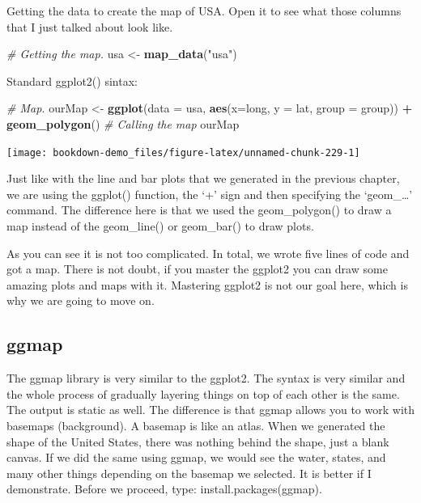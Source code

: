 \documentclass[]{book}
\newenvironment{Shaded}{\begin{snugshade}}{\end{snugshade}}
\newcommand{\CommentTok}[1]{\textcolor[rgb]{0.56,0.35,0.01}{\textit{#1}}}
\newcommand{\DataTypeTok}[1]{\textcolor[rgb]{0.13,0.29,0.53}{#1}}
\newcommand{\KeywordTok}[1]{\textcolor[rgb]{0.13,0.29,0.53}{\textbf{#1}}}
\newcommand{\NormalTok}[1]{#1}
\newcommand{\OperatorTok}[1]{\textcolor[rgb]{0.81,0.36,0.00}{\textbf{#1}}}
\newcommand{\StringTok}[1]{\textcolor[rgb]{0.31,0.60,0.02}{#1}}
\begin{document}
Getting the data to create the map of USA. Open it to see what those columns that I just talked about look like.

\begin{Shaded}
\begin{Highlighting}[]
\CommentTok{# Getting the map.}
\NormalTok{  usa <-}\StringTok{ }\KeywordTok{map_data}\NormalTok{(}\StringTok{"usa"}\NormalTok{)}
\end{Highlighting}
\end{Shaded}

Standard ggplot2() sintax:

\begin{Shaded}
\begin{Highlighting}[]
\CommentTok{# Map.}
\NormalTok{  ourMap <-}\StringTok{ }\KeywordTok{ggplot}\NormalTok{(}\DataTypeTok{data =}\NormalTok{ usa, }\KeywordTok{aes}\NormalTok{(}\DataTypeTok{x=}\NormalTok{long, }\DataTypeTok{y =}\NormalTok{ lat, }\DataTypeTok{group =}\NormalTok{ group)) }\OperatorTok{+}\StringTok{ }
\StringTok{  }\KeywordTok{geom_polygon}\NormalTok{()}
\CommentTok{# Calling the map  }
\NormalTok{  ourMap}
\end{Highlighting}
\end{Shaded}

\begin{center}\texttt{[image: bookdown-demo\_files/figure-latex/unnamed-chunk-229-1]} \end{center}

Just like with the line and bar plots that we generated in the previous chapter, we are using the ggplot() function, the `+' sign and then specifying the `geom\_\ldots{}' command. The difference here is that we used the geom\_polygon() to draw a map instead of the geom\_line() or geom\_bar() to draw plots.

As you can see it is not too complicated. In total, we wrote five lines of code and got a map. There is not doubt, if you master the ggplot2 you can draw some amazing plots and maps with it. Mastering ggplot2 is not our goal here, which is why we are going to move on.

\hypertarget{ggmap}{%
\subsection{ggmap}\label{ggmap}}

The ggmap library is very similar to the ggplot2. The syntax is very similar and the whole process of gradually layering things on top of each other is the same. The output is static as well. The difference is that ggmap allows you to work with basemaps (background). A basemap is like an atlas. When we generated the shape of the United States, there was nothing behind the shape, just a blank canvas. If we did the same using ggmap, we would see the water, states, and many other things depending on the basemap we selected. It is better if I demonstrate. Before we proceed, type: install.packages(ggmap).
\end{document}
